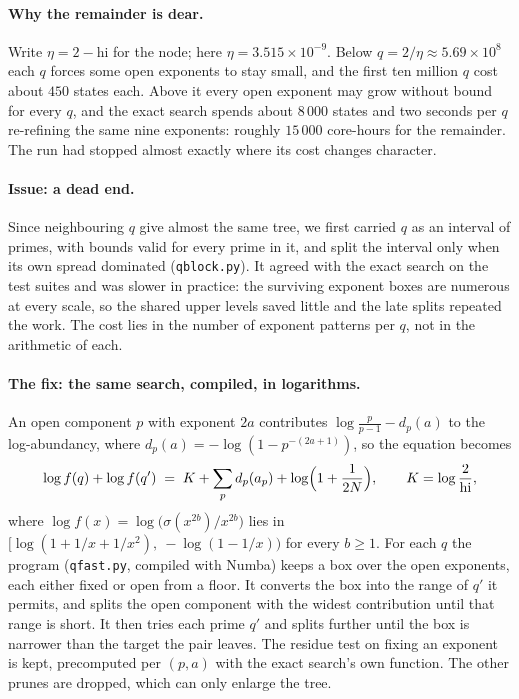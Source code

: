 \documentclass[11pt]{amsart}
\theoremstyle{remark}
\begin{document}
\paragraph{Why the remainder is dear.} Write $\eta = 2 - \mathrm{hi}$ for the
node; here $\eta = 3.515 \times 10^{-9}$. Below $q = 2/\eta \approx 5.69 \times
10^{8}$ each $q$ forces some open exponents to stay small, and the first ten
million $q$ cost about $450$ states each. Above it every open exponent may grow
without bound for every $q$, and the exact search spends about $8\,000$ states
and two seconds per $q$ re-refining the same nine exponents: roughly
$15\,000$ core-hours for the remainder. The run had stopped almost exactly
where its cost changes character.

\paragraph{Issue: a dead end.} Since neighbouring $q$ give almost the same
tree, we first carried $q$ as an interval of primes, with bounds valid for
every prime in it, and split the interval only when its own spread dominated
(\texttt{qblock.py}). It agreed with the exact search on the test suites and
was slower in practice: the surviving exponent boxes are numerous at every
scale, so the shared upper levels saved little and the late splits repeated
the work. The cost lies in the number of exponent patterns per $q$, not in
the arithmetic of each.

\paragraph{The fix: the same search, compiled, in logarithms.} An open
component $p$ with exponent $2a$ contributes $\log\frac{p}{p-1} - d_p(a)$ to
the log-abundancy, where $d_p(a) = -\log(1 - p^{-(2a+1)})$, so the equation
becomes
\[
  \log f(q) + \log f(q') \;=\; K + \sum_p d_p(a_p) + \log\Bigl(1 + \frac{1}{2N}\Bigr),
  \qquad K = \log\frac{2}{\mathrm{hi}},
\]
where $\log f(x) = \log\bigl(\sigma(x^{2b})/x^{2b}\bigr)$ lies in
$[\log(1 + 1/x + 1/x^{2}),\ -\log(1 - 1/x))$ for every $b \ge 1$. For each $q$
the program (\texttt{qfast.py}, compiled with Numba) keeps a box over the open
exponents, each either fixed or open from a floor. It converts the box into
the range of $q'$ it permits, and splits the open component with the widest
contribution until that range is short. It then tries each prime $q'$ and
splits further until the box is narrower than the target the pair leaves. The
residue test on fixing an exponent is kept, precomputed per $(p, a)$ with the
exact search's own function. The other prunes are dropped, which can only
enlarge the tree.
\end{document}
